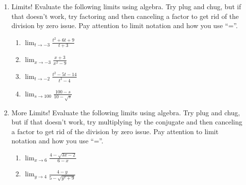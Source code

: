 \documentclass[12pt]{report}
\begin{document}
\begin{enumerate}
\item Limits!  Evaluate the following limits using algebra. Try plug and chug, but if that doesn't work, try  factoring and then canceling a factor to get rid of the division by zero issue. Pay attention to limit notation and how you use ``=''.

\vspace{1cm}

\begin{multicols}{2}
\begin{enumerate}

\item $\displaystyle\lim_{t\rightarrow -3}\frac{t^2+6t+9}{t+3}$
\vskip 4cm

\item $\displaystyle\lim_{x\rightarrow -3}\frac{x+3}{x^2-9}$
\vskip 4cm
%

\item $\displaystyle\lim_{t\rightarrow-2}\frac{t^2-5t-14}{t^2-4}$
\vskip 4cm

\item $\displaystyle\lim_{s\rightarrow100}\frac{100-s}{10-\sqrt{s}}$
\vskip 4cm



\end{enumerate}
\end{multicols}



\vskip 4cm
\item More Limits!  Evaluate the following limits using algebra. Try plug and chug, but if that doesn't work, try multiplying by the conjugate and then canceling a factor to get rid of the division by zero issue.  Pay attention to limit notation and how you use ``=''.

\vspace{1cm}


\begin{enumerate}

\item $\displaystyle\lim_{x\rightarrow 6}\frac{4-\sqrt{3x-2}}{6-x}$
\vskip 4cm

\item $\displaystyle\lim_{y\rightarrow4}\frac{4-y}{5-\sqrt{y^2+9}}$
\vskip 4cm


\end{enumerate}
\end{enumerate}
\end{document}
